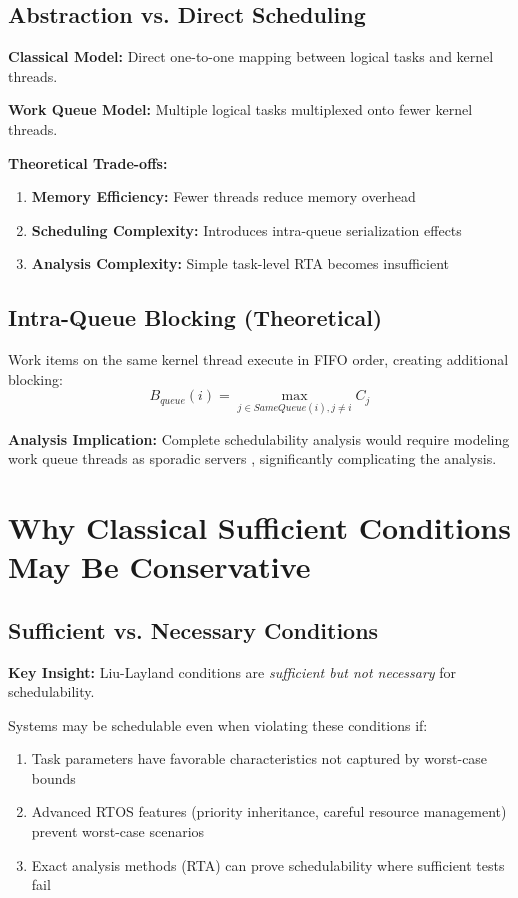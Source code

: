 \documentclass[12pt,a4paper]{article}
\begin{document}
\subsection{Abstraction vs. Direct Scheduling}

\textbf{Classical Model:} Direct one-to-one mapping between logical tasks and kernel threads.

\textbf{Work Queue Model:} Multiple logical tasks multiplexed onto fewer kernel threads.

\textbf{Theoretical Trade-offs:}
\begin{enumerate}
\item \textbf{Memory Efficiency:} Fewer threads reduce memory overhead
\item \textbf{Scheduling Complexity:} Introduces intra-queue serialization effects
\item \textbf{Analysis Complexity:} Simple task-level RTA becomes insufficient
\end{enumerate}

\subsection{Intra-Queue Blocking (Theoretical)}

Work items on the same kernel thread execute in FIFO order, creating additional blocking:
\begin{equation}
B_{queue}(i) = \max_{j \in SameQueue(i), j \neq i} C_j
\end{equation}

\textbf{Analysis Implication:} Complete schedulability analysis would require modeling work queue threads as sporadic servers \cite{sprunt1989}, significantly complicating the analysis.

\section{Why Classical Sufficient Conditions May Be Conservative}

\subsection{Sufficient vs. Necessary Conditions}

\textbf{Key Insight:} Liu-Layland conditions are \emph{sufficient but not necessary} for schedulability.

Systems may be schedulable even when violating these conditions if:
\begin{enumerate}
\item Task parameters have favorable characteristics not captured by worst-case bounds
\item Advanced RTOS features (priority inheritance, careful resource management) prevent worst-case scenarios
\item Exact analysis methods (RTA) can prove schedulability where sufficient tests fail
\end{enumerate}
\end{document}
